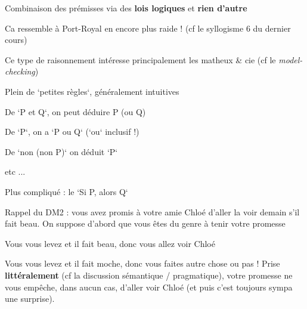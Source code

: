 \begin{frame}
	
	\begin{description}[labelindent=6pt,style=multiline,leftmargin=1.3in]
		 \setlength\itemsep{1em}
		 \item[En gros] Combinaison des prémisses via des \textbf{lois logiques} \pause et \textbf{rien d'autre}\pause
		 \item[Remarque] Ca ressemble à Port-Royal \pause en encore plus raide ! (cf le syllogisme 6 du dernier cours)\pause
		 \item[] Ce type de raisonnement intéresse principalement les matheux \& cie (cf le \textit{model-checking})
		  	\end{description}
\end{frame}

\begin{frame}
	
	\begin{description}[labelindent=6pt,style=multiline,leftmargin=1.3in]
		 \setlength\itemsep{1em}
		 \item[En gros] Plein de `petites règles`, généralement intuitives\pause
		 \item[Exemples] De `P et Q`, on peut déduire P \pause(ou Q)\pause
		 \item[] De `P`, on a `P ou Q` \pause (`ou` inclusif !)\pause
		 \item[] De `non (non P)` on déduit `P`\pause
		 \item[] etc ...
  	\end{description}
\end{frame}


\begin{frame}
	
Plus compliqué : le `Si P, alors Q`\pause \newline
	
Rappel du DM2 : vous avez promis à votre amie Chloé d'aller la voir demain s'il fait beau. On suppose d'abord que vous êtes du genre à tenir votre promesse\pause \newline

Vous vous levez et il fait beau, donc vous \pause allez voir Chloé\pause \newline

Vous vous levez et il fait moche, donc vous \pause faites autre chose \pause ou pas ! \pause Prise \textbf{littéralement} (cf la discussion sémantique / pragmatique), votre promesse ne vous empêche, dans aucun cas, d'aller voir Chloé (et puis c'est toujours sympa une surprise).
\end{frame}

